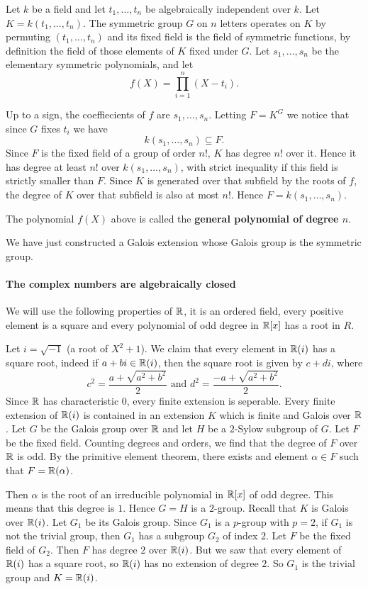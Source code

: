 \begin{example}[]
    Let $k$ be a field and let $t_1,\ldots,t_n$ be algebraically independent over $k$. Let $K = k(t_1,\ldots,t_n)$. The symmetric group $G$ on $n$ letters operates on $K$ by permuting $(t_1,\ldots,t_n)$ and its fixed field is the field of symmetric functions, by definition the field of those elements of $K$ fixed under $G$.
    Let $s_1,\ldots,s_n$ be the elementary symmetric polynomials, and let \[
    f(X) = \prod_{i=1}^n(X-t_i).
\]
   
Up to a sign, the coeffiecients of $f$ are $s_1,\ldots,s_n$. Letting $F=K^G$ we notice that since $G$ fixes  $t_i$ we have  \[
    k(s_1,\ldots,s_n)\subseteq F.
\]
Since $F$ is the fixed field of a group of order $n$!, $K$ has degree $n$! over it. Hence it has degree at least $n$! over $k(s_1,\ldots,s_n)$, with strict inequality if this field is strictly smaller than $F$. Since $K$ is generated over that subfield by the roots of $f$, the degree of $K$ over that subfield is also at most $n$!. Hence $F=k(s_1,\ldots,s_n)$.
\begin{definition}[]
    The polynomial $f(X)$ above is called the \textbf{general polynomial of degree $n$}.
\end{definition}
We have just constructed a Galois extension whose Galois group is the symmetric group.
\end{example}

\begin{example}[]
\paragraph{The complex numbers are algebraically closed}
We will use the following properties of $\mathbb{R}$, it is an ordered field, every positive element is a square and every polynomial of odd degree in $\mathbb{R}[x]$ has a root in $R$.

Let $i = \sqrt{-1}$ (a root of $X^2+1$). We claim that every element in $\mathbb{R}(i)$ has a square root, indeed if $a+bi\in \mathbb{R}(i)$, then the square root is given by $c+di$, where \[
    c^2 = \frac{a+\sqrt{a^2+b^2}}{2} \text{ and } d^2 = \frac{-a+\sqrt{a^2+b^2}}{2}  
.\]
Since $\mathbb{R}$ has characteristic $0$, every finite extension is seperable. Every finite extension of $\mathbb{R}(i)$ is contained in an extension $K$ which is finite and Galois over $\mathbb{R}$. Let $G$ be the Galois group over $\mathbb{R}$ and let $H$ be a $2$-Sylow subgroup of $G$. Let $F$ be the fixed field. Counting degrees and orders, we find that the degree of $F$ over $\mathbb{R}$ is odd. By the primitive element theorem, there exists and element $\alpha\in F$ such that $F=\mathbb{R}(\alpha)$.

Then $\alpha$ is the root of an irreducible polynomial in $\mathbb{R}[x]$ of odd degree. This means that this degree is $1$. Hence $G=H$ is a $2$-group.
Recall that $K$ is Galois over $\mathbb{R}(i)$. Let $G_1$ be its Galois group. Since $G_1$ is a $p$-group with $p=2$, if $G_1$ is not the trivial group, then $G_1$ has a subgroup $G_2$ of index $2$. Let $F$ be the fixed field of $G_2$.
Then $F$ has degree $2$ over $\mathbb{R}(i)$. But we saw that every element of $\mathbb{R}(i)$ has a square root, so $\mathbb{R}(i)$ has no extension of degree $2$. So $G_1$ is the trivial group and $K=\mathbb{R}(i)$.
\end{example}

